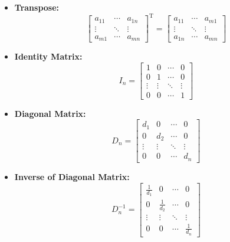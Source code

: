 \documentclass{article}
\begin{document}
\begin{itemize}
    \item \textbf{Transpose:}
    \begin{equation}
        \left[
            \begin{array}{ccc}
                a_{11} & \cdots & a_{1n} \\
                \vdots & \ddots & \vdots \\
                a_{m1} & \cdots & a_{mn}
            \end{array}
        \right]^{\mathrm{T}}
        =
        \left[
            \begin{array}{ccc}
                a_{11} & \cdots & a_{m1} \\
                \vdots & \ddots & \vdots \\
                a_{1n} & \cdots & a_{mn}
            \end{array}
        \right]
        \label{eq:trans}
    \end{equation}

    \item \textbf{Identity Matrix:}
    \begin{equation}
        I_n =
        \left[
            \begin{array}{cccc}
                1 & 0 & \cdots & 0 \\
                0 & 1 & \cdots & 0 \\
                \vdots & \vdots & \ddots & \vdots \\
                0 & 0 & \cdots & 1
            \end{array}
        \right]
        \label{eq:iden}
    \end{equation}

    \item \textbf{Diagonal Matrix:}
    \begin{equation}
        D_n =
        \left[
            \begin{array}{cccc}
                d_1 & 0 & \cdots & 0 \\
                0 & d_2 & \cdots & 0 \\
                \vdots & \vdots & \ddots & \vdots \\
                0 & 0 & \cdots & d_n
            \end{array}
        \right]
        \label{eq:diagm}
    \end{equation}

    \item \textbf{Inverse of Diagonal Matrix:}
    \begin{equation}
        D_n^{-1} =
        \left[
            \begin{array}{cccc}
                \frac{1}{d_1} & 0 & \cdots & 0 \\
                0 & \frac{1}{d_2} & \cdots & 0 \\
                \vdots & \vdots & \ddots & \vdots \\
                0 & 0 & \cdots & \frac{1}{d_n}
            \end{array}
        \right]
        \label{eq:diagminv}
    \end{equation}

\end{itemize}
\end{document}
